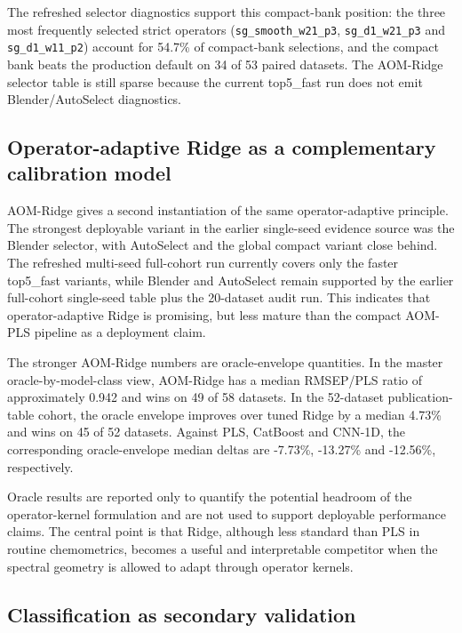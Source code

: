 \documentclass[11pt,a4paper]{article}
\begin{document}
The refreshed selector diagnostics support this compact-bank position:
the three most frequently selected strict operators
(\texttt{sg\_smooth\_w21\_p3}, \texttt{sg\_d1\_w21\_p3} and
\texttt{sg\_d1\_w11\_p2}) account for 54.7\% of compact-bank selections, and
the compact bank beats the production default on 34 of 53 paired datasets.
The AOM-Ridge selector table is still sparse because the current top5\_fast
run does not emit Blender/AutoSelect diagnostics.



\subsection{Operator-adaptive Ridge as a complementary calibration model}

AOM-Ridge gives a second instantiation of the same operator-adaptive principle.
The strongest deployable variant in the earlier single-seed evidence source
was the Blender selector, with AutoSelect and the global compact variant close
behind.  The refreshed multi-seed full-cohort run currently covers only the
faster top5\_fast variants, while Blender and AutoSelect remain supported by
the earlier full-cohort single-seed table plus the 20-dataset audit run.  This
indicates that operator-adaptive Ridge is promising, but less mature than the
compact AOM-PLS pipeline as a deployment claim.

The stronger AOM-Ridge numbers are oracle-envelope quantities.  In the master
oracle-by-model-class view, AOM-Ridge has a median RMSEP/PLS ratio of
approximately 0.942 and wins on 49 of 58 datasets.  In the 52-dataset
publication-table cohort, the oracle envelope improves over tuned Ridge by a
median 4.73\% and wins on 45 of 52 datasets.  Against PLS, CatBoost and CNN-1D,
the corresponding oracle-envelope median deltas are -7.73\%, -13.27\% and
-12.56\%, respectively.

Oracle results are reported only to quantify the potential headroom of the
operator-kernel formulation and are not used to support deployable performance
claims.  The central point is that Ridge, although less standard than PLS in
routine chemometrics, becomes a useful and interpretable competitor when the
spectral geometry is allowed to adapt through operator kernels.

\subsection{Classification as secondary validation}
\end{document}
